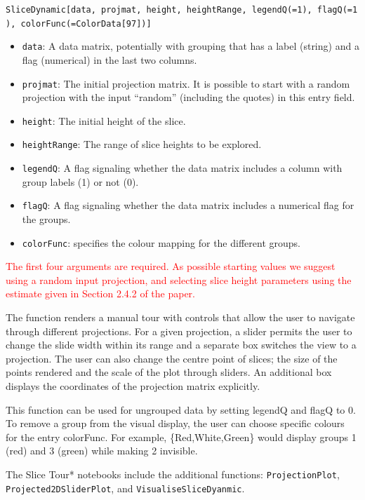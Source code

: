 \documentclass[]{interact}
\theoremstyle{plain}%
\theoremstyle{definition}
\theoremstyle{remark}
\providecommand{\tightlist}{%
  \setlength{\itemsep}{0pt}\setlength{\parskip}{0pt}}
\def\tightlist{}
\begin{document}
\texttt{SliceDynamic{[}data,\ projmat,\ height,\ heightRange,\ legendQ(=1),\ flagQ(=1),\ colorFunc(=ColorData{[}97{]}){]}}

\begin{itemize}
\tightlist
\item
  \texttt{data}: A data matrix, potentially with grouping that has a
  label (string) and a flag (numerical) in the last two columns.
\item
  \texttt{projmat}: The initial projection matrix. It is possible to
  start with a random projection with the input ``random'' (including
  the quotes) in this entry field.
\item
  \texttt{height}: The initial height of the slice.
\item
  \texttt{heightRange}: The range of slice heights to be explored.
\item
  \texttt{legendQ}: A flag signaling whether the data matrix includes a
  column with group labels (1) or not (0).
\item
  \texttt{flagQ}: A flag signaling whether the data matrix includes a
  numerical flag for the groups.
\item
  \texttt{colorFunc}: specifies the colour mapping for the different
  groups.
\end{itemize}

\textcolor{red}{The first four arguments are required. As possible starting values we suggest using a random input projection, and selecting slice height parameters using the estimate given in Section 2.4.2 of the paper.}

The function renders a manual tour with controls that allow the user to
navigate through different projections. For a given projection, a slider
permits the user to change the slide width within its range and a
separate box switches the view to a projection. The user can also change
the centre point of slices; the size of the points rendered and the
scale of the plot through sliders. An additional box displays the
coordinates of the projection matrix explicitly.

This function can be used for ungrouped data by setting legendQ and
flagQ to 0. To remove a group from the visual display, the user can
choose specific colours for the entry colorFunc. For example,
\{Red,White,Green\} would display groups 1 (red) and 3 (green) while
making 2 invisible.

The Slice Tour* notebooks include the additional functions:
\texttt{ProjectionPlot}, \texttt{Projected2DSliderPlot}, and
\texttt{VisualiseSliceDyanmic}.
\end{document}
